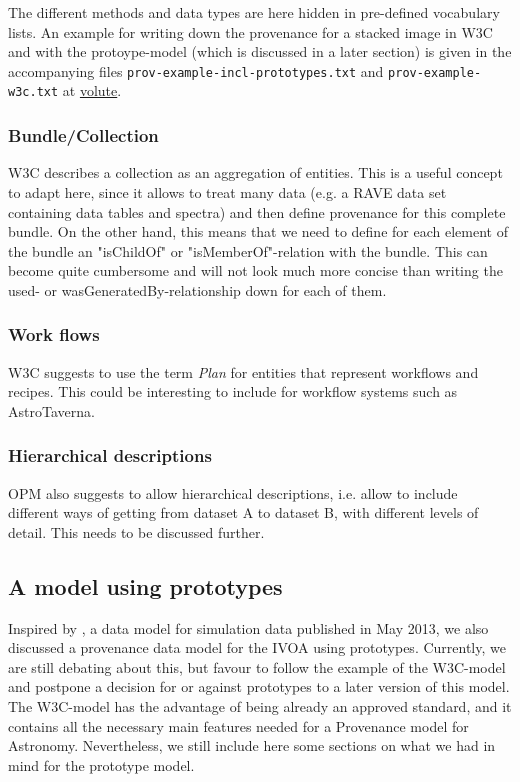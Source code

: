 \documentclass[11pt,a4paper]{ivoa}
\begin{document}
The different methods and data types are here hidden in pre-defined vocabulary lists. 
An example for writing down the provenance for a stacked image in W3C and with the protoype-model (which is discussed in a later section) is given in the accompanying files 
\texttt{prov-example-incl-prototypes.txt} and 
\texttt{prov-example-w3c.txt} at \href{https://volute.g-vo.org/svn/trunk/projects/dm/provenance/description/}{volute}.




\subsubsection{Bundle/Collection}
W3C describes a collection as an aggregation of entities. This is a useful concept to adapt here, since it allows to treat many data (e.g. a RAVE data set containing data tables and spectra) and then define provenance for this complete bundle.
On the other hand, this means that we need to define for each element of the bundle an "isChildOf" or "isMemberOf"-relation with the bundle.
This can become quite cumbersome and will not look much more concise than writing the used- or wasGeneratedBy-relationship down for each of them.


\subsubsection{Work flows}
W3C suggests to use the term \emph{Plan} for entities that represent workflows and recipes. This could be interesting to include for workflow systems such as AstroTaverna. 


\subsubsection{Hierarchical descriptions}
OPM also suggests to allow hierarchical descriptions, i.e. allow to include different ways of getting from dataset A to dataset B, with different levels of detail. 
This needs to be discussed further. 


\subsection{A model using prototypes}
Inspired by \cite{std:SimDM}, a data model for simulation data published in May 2013, we also discussed a provenance data model for the IVOA using prototypes. 
Currently, we are still debating about this, but favour to follow the example of the W3C-model and postpone a decision for or against prototypes to a later version of this model. 
The W3C-model has the advantage of being already an approved standard, and it contains all the necessary main features needed for a Provenance model for Astronomy. Nevertheless, we still include here some sections on what we had in mind for the prototype model. 
\end{document}
